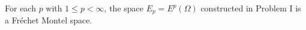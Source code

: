 For each $p$ with $1 \leq p < \infty$, the space $E_{p} = E^{p}(\Omega)$ constructed in Problem I is a Fr\'{e}chet Montel space.
